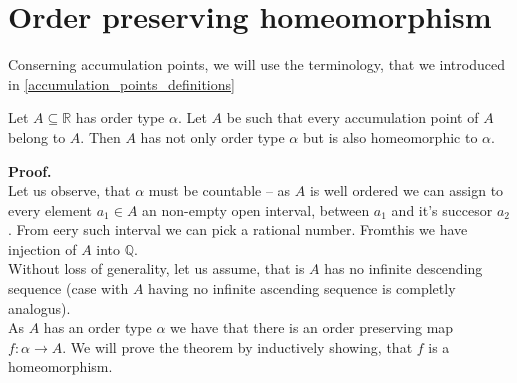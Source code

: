\chapter{Order preserving homeomorphism}
Conserning accumulation points, we will use the terminology, that we introduced in 
\ref{accumulation_points_definitions}

\begin{theorem}\label{order_preserving_homeomorphism_theorem}
Let $A \subseteq \mathbb{R}$ has order type $\alpha$. 
Let $A$ be such that every accumulation point of $A$ belong to $A$. Then $A$ has not only 
order type $\alpha$ but is also homeomorphic to $\alpha$. 
\end{theorem}

\textbf{Proof.} \\
Let us observe, that $\alpha$ must be countable -- as $A$ is well ordered we can assign to every 
element $a_1 \in A$ an non-empty open interval, between $a_1$ and it's succesor $a_2$. 
From eery such interval we can pick a rational number. Fromthis we have injection of $A$ into 
$\mathbb{Q}$. \\
Without loss of generality, let us assume, that is $A$ has no infinite descending sequence 
(case with $A$ having no infinite ascending sequence is completly analogus). \\

As $A$ has an order type $\alpha$ we have that there is an order preserving map 
$f : \alpha \to A$. 
We will prove the theorem by inductively showing, that $f$ is a homeomorphism. \\


